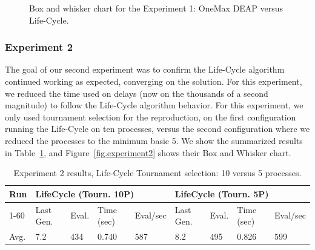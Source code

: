 \documentclass[graybox]{svmult}
\begin{document}
\begin{figure}
    \caption{Box and whisker chart for the Experiment 1: OneMax DEAP versus Life-Cycle.} \label{fig.experiment1}
  \end{figure}


\subsubsection{Experiment 2} The goal of our second experiment was to confirm
the Life-Cycle algorithm continued working as expected, converging on the
solution. For this experiment, we reduced the time used on delays (now on the
thousands of a second magnitude) to follow the Life-Cycle algorithm behavior.
For this experiment, we only used tournament selection for the reproduction, on
the first configuration running the Life-Cycle on ten processes, versus the
second configuration where we reduced the processes to the minimum basic 5. We
show the summarized results in Table~\ref{tab.experiment2}, and
Figure~\ref{fig.experiment2} shows their Box and Whisker chart.

\begin{table}[]
    \centering        
    \caption{Experiment 2 results, Life-Cycle Tournament selection: 10 versus 5 processes.}\label{tab.experiment2}
    \begin{tabular}{|l|l|l|l|l|l|l|l|l|}
    \hline
    Run & \multicolumn{4}{l|}{LifeCycle (Tourn. 10P)} & \multicolumn{4}{l|}{LifeCycle (Tourn. 5P)} \\ \hline
    1-60 & Last Gen. & Eval. & Time (sec) & Eval/sec & Last Gen. & Eval. & Time (sec) & Eval/sec \\ \hline
    Avg. & 7.2 & 434 & 0.740 & 587 & 8.2 & 495 & 0.826 & 599 \\ \hline
    \end{tabular}
    \end{table}
\end{document}
